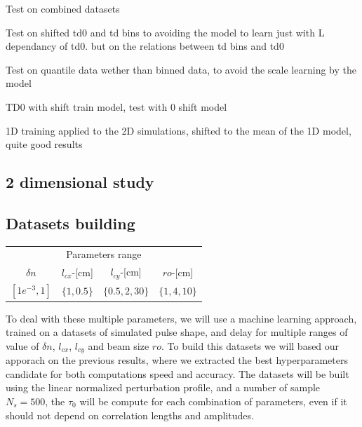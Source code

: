 \documentclass[11pt,a4paper]{report}
\begin{document}
\begin{multicols*}{2}
    Test on combined datasets

    Test on shifted td0 and td bins to avoiding the model to learn just with L dependancy of td0.
    but on the relations between td bins and td0

    Test on quantile data wether than binned data, to avoid the scale learning by the model

    TD0 with shift train model, test with 0 shift model

    1D training applied to the 2D simulations, shifted to the mean of the 1D model, quite good results
\end{multicols*}
\begin{multicols*}{2}


    \section{2 dimensional study}
    \subsection{Datasets building}
    \begin{center}
        \begin{tabular}{cccc}
            \toprule
            \multicolumn{4}{c}{Parameters range}                            \\
            \cmidrule{1 -4}
            $\delta n$     & $l_{cx}$-[cm] & $l_{cy}$-[cm]   & $ro$-[cm]    \\
            \midrule
            $[1e^{-3}, 1]$ & $\{1, 0.5 \}$ & $\{0.5,2,30 \}$ & $\{1,4,10\}$ \\
            \bottomrule
        \end{tabular}
    \end{center}
    To deal with these multiple parameters, we will use a machine learning approach, trained on a datasets of simulated pulse shape, and delay for multiple ranges of value of $\delta n$, $l_{cx}$, $l_{cy}$ and beam size $ro$.
    To build this datasets we will based our apporach on the previous results, where we extracted the best hyperparameters candidate for both computations speed and accuracy. The datasets will be built using the linear normalized perturbation profile, and a number of sample $N_s = 500$, the $\tau_0$ will be compute for each combination of parameters, even if it should not depend on correlation lengths and amplitudes.


\end{multicols*}
\end{document}
